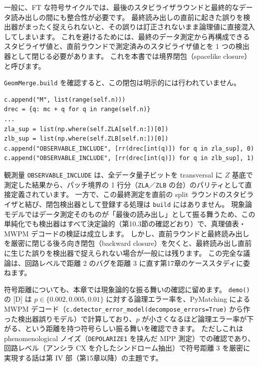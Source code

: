 一般に、FT な符号サイクルでは、最後のスタビライザラウンドと最終的なデータ読み出しの間にも整合性が必要です。
最終読み出しの直前に起きた誤りを検出器がまったく捉えられないと、その誤りは訂正されないまま論理値に直接混入してしまいます。
これを避けるためには、最終のデータ測定から再構成できるスタビライザ値と、直前ラウンドで測定済みのスタビライザ値とを 1 つの検出器として閉じる必要があります。
これを本書では境界閉包（spacelike closure）と呼びます。

\texttt{GeomMerge.build} を確認すると、この閉包は明示的には行われていません。

\begin{lstlisting}[caption={最終読み出しと観測量（src/stages/01\_mpp/src/ftqc/geom\_lattice\_surgery.py build 内）}]
c.append("M", list(range(self.n)))
drec = {q: mc + q for q in range(self.n)}
...
zla_sup = list(np.where(self.ZLA[self.n:])[0])
zlb_sup = list(np.where(self.ZLB[self.n:])[0])
c.append("OBSERVABLE_INCLUDE", [rr(drec[int(q)]) for q in zla_sup], 0)
c.append("OBSERVABLE_INCLUDE", [rr(drec[int(q)]) for q in zlb_sup], 1)
\end{lstlisting}

観測量 \texttt{OBSERVABLE\_INCLUDE} は、全データ量子ビットを transversal に $Z$ 基底で測定した結果から、パッチ境界の 1 行分（\texttt{ZLA}／\texttt{ZLB} の台）のパリティとして直接定義されています。
一方で、この最終測定を直前の split ラウンドのスタビライザと結び、閉包検出器として登録する処理は \texttt{build} にはありません。
現象論モデルではデータ測定そのものが「最後の読み出し」として振る舞うため、この単純化でも検出器はすべて決定論的（第10.3節の確認どおり）で、真理値表・MWPM デコードの検証は成立します。
しかし、直前ラウンドと最終読み出しを厳密に閉じる後ろ向き閉包（backward closure）を欠くと、最終読み出し直前に生じた誤りを検出器で捉えられない場合が一般には残ります。
この完全な議論は、回路レベルで距離 2 のバグを距離 3 に直す第17章のケーススタディに委ねます。

符号距離についても、本章では現象論的な振る舞いの確認に留めます。
\texttt{demo()} の [D] は $p\in\{0.002,0.005,0.01\}$ に対する論理エラー率を、PyMatching による MWPM デコード（\texttt{c.detector\_error\_model(decompose\_errors=True)} から作った検出器誤りモデル）で計算しており、$p$ が小さくなるほど論理エラー率が下がる、という距離を持つ符号らしい振る舞いを確認できます。
ただしこれは phenomenological ノイズ（\texttt{DEPOLARIZE1} を挟んだ MPP 測定）での確認であり、回路レベル（アンシラ CX を介したシンドローム抽出）で符号距離 3 を厳密に実現する話は第 IV 部（第15章以降）の主題です。

